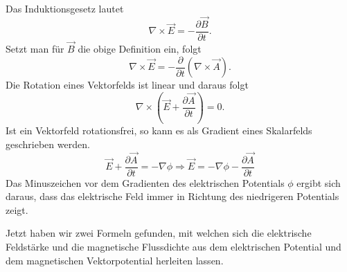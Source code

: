 Das Induktionsgesetz lautet
\begin{equation*}
	\nabla \times \vec{E} = - \frac{\partial \vec{B}}{\partial t}.
\end{equation*}
Setzt man für $\vec{B}$ die obige Definition ein, folgt
\begin{equation*}
	\nabla \times \vec{E} = - \frac{\partial}{\partial t}(\nabla \times \vec{A}).
\end{equation*}
Die Rotation eines Vektorfelds ist linear und daraus folgt
\begin{equation*}
	\nabla \times \left( \vec{E} + \frac{\partial \vec{A}}{\partial t}\right) = 0.
\end{equation*}
Ist ein Vektorfeld rotationsfrei, so kann es als Gradient eines Skalarfelds geschrieben werden.
\begin{equation*}
	\vec{E} + \frac{\partial \vec{A}}{\partial t} = -\nabla \phi \Rightarrow \vec{E} = -\nabla \phi -\frac{\partial \vec{A}}{\partial t}
\end{equation*}
Das Minuszeichen vor dem Gradienten des elektrischen Potentials $\phi$ ergibt sich daraus, dass das elektrische Feld immer in Richtung des niedrigeren Potentials zeigt.

Jetzt haben wir zwei Formeln gefunden, mit welchen sich die elektrische Feldstärke und die magnetische Flussdichte aus dem elektrischen Potential und dem magnetischen Vektorpotential herleiten lassen.
